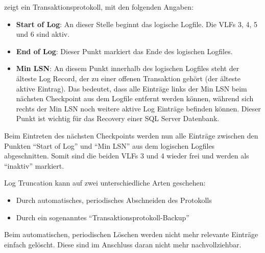            zeigt ein Transaktionsprotokoll, mit den
          folgenden Angaben:
          \begin{itemize}
              \item \textbf{Start of Log}: An dieser Stelle beginnt das logische
              Logfile. Die VLFs 3, 4, 5 und 6 sind aktiv.
              \item \textbf{End of Log}: Dieser Punkt markiert das Ende des
              logischen Logfiles.
              \item \textbf{Min LSN}: An diesem Punkt innerhalb des logischen
              Logfiles steht der älteste Log Record, der zu einer offenen
              Transaktion gehört (der älteste aktive Eintrag). Das bedeutet,
              dass alle Einträge links der Min LSN beim nächsten Checkpoint aus
              dem Logfile entfernt werden können, während sich rechts der Min
              LSN noch weitere aktive Log Einträge befinden können. Dieser Punkt
              ist wichtig für das Recovery einer SQL Server Datenbank.
          \end{itemize}
          Beim Eintreten des nächsten Checkpoints werden nun alle Einträge
          zwischen den Punkten \enquote{Start of Log} und \enquote{Min LSN} aus
          dem logischen Logfiles abgeschnitten. Somit sind die beiden VLFs 3 und
          4 wieder frei und werden als \enquote{inaktiv} markiert.
          
          Log Truncation kann auf zwei unterschiedliche Arten geschehen:
          \begin{itemize}
              \item Durch automatisches, periodisches Abschneiden des Protokolls
              \item Durch ein sogenanntes \enquote{Transaktionsprotokoll-Backup}
          \end{itemize}
          Beim automatischen, periodischen Löschen werden nicht mehr relevante
          Einträge einfach gelöscht. Diese sind im Anschluss daran nicht mehr
          nachvollziehbar.
          
